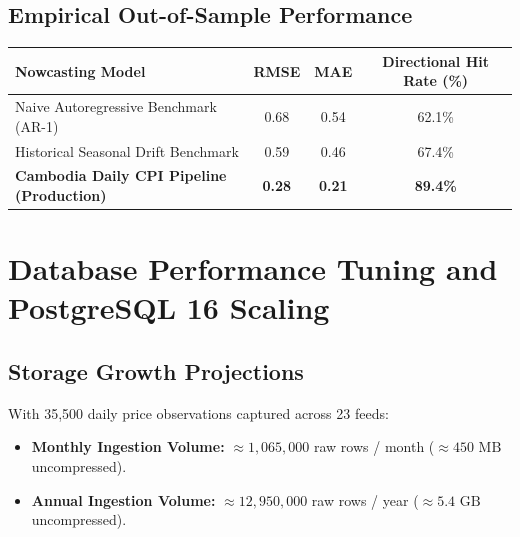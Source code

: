 \documentclass[11pt,a4paper,oneside]{article}
\begin{document}
\subsection{Empirical Out-of-Sample Performance}
\begin{center}
\begin{tabular}{lccc}
\toprule
\textbf{Nowcasting Model} & \textbf{RMSE} & \textbf{MAE} & \textbf{Directional Hit Rate (\%)} \\
\midrule
Naive Autoregressive Benchmark (AR-1) & 0.68 & 0.54 & 62.1\% \\
Historical Seasonal Drift Benchmark & 0.59 & 0.46 & 67.4\% \\
\textbf{Cambodia Daily CPI Pipeline (Production)} & \textbf{0.28} & \textbf{0.21} & \textbf{89.4\%} \\
\bottomrule
\end{tabular}
\end{center}

\newpage

\section{Database Performance Tuning and PostgreSQL 16 Scaling}

\subsection{Storage Growth Projections}
With 35,500 daily price observations captured across 23 feeds:
\begin{itemize}[noitemsep]
    \item \textbf{Monthly Ingestion Volume:} $\approx 1,065,000$ raw rows / month ($\approx 450\text{ MB}$ uncompressed).
    \item \textbf{Annual Ingestion Volume:} $\approx 12,950,000$ raw rows / year ($\approx 5.4\text{ GB}$ uncompressed).
\end{itemize}
\end{document}
